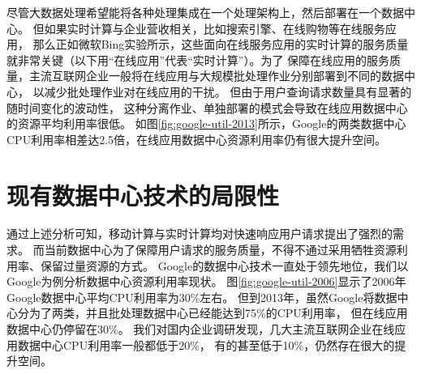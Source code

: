 尽管大数据处理希望能将各种处理集成在一个处理架构上，然后部署在一个数据中心。
但如果实时计算与企业营收相关，比如搜索引擎、在线购物等在线服务应用，
那么正如微软Bing实验所示，这些面向在线服务应用的实时计算的服务质量就非常关键（以下用``在线应用''代表``实时计算''）。为了
保障在线应用的服务质量，主流互联网企业一般将在线应用与大规模批处理作业分别部署到不同的数据中心，
以减少批处理作业对在线应用的干扰。
但由于用户查询请求数量具有显著的随时间变化的波动性，
这种分离作业、单独部署的模式会导致在线应用数据中心的资源平均利用率很低。
如图\ref{fig:google-util-2013}所示，Google的两类数据中心CPU利用率相差达2.5倍，在线应用数据中心资源利用率仍有很大提升空间。




\section{现有数据中心技术的局限性}

通过上述分析可知，移动计算与实时计算均对快速响应用户请求提出了强烈的需求。
而当前数据中心为了保障用户请求的服务质量，不得不通过采用牺牲资源利用率、保留过量资源的方式。
Google的数据中心技术一直处于领先地位，我们以Google为例分析数据中心资源利用率现状。
图\ref{fig:google-util-2006}显示了2006年Google数据中心平均CPU利用率为30\%左右。
但到2013年，虽然Google将数据中心分为了两类，并且批处理数据中心已经能达到75\%的CPU利用率，
但在线应用数据中心仍停留在30\%。
我们对国内企业调研发现，几大主流互联网企业在线应用数据中心CPU利用率一般都低于20\%，
有的甚至低于10\%，仍然存在很大的提升空间。

